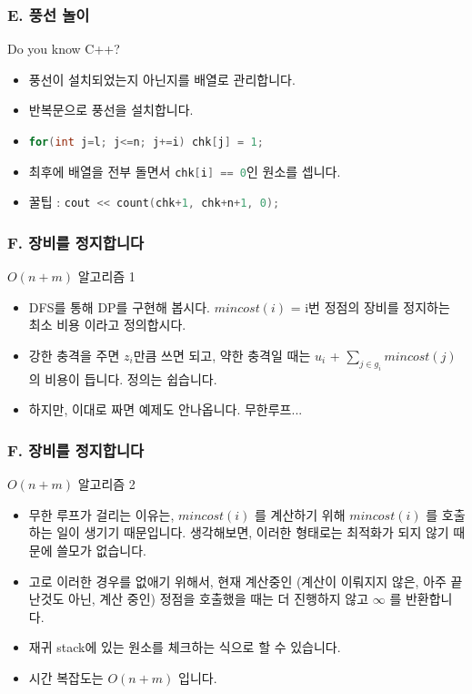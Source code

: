\documentclass{beamer}
\begin{document}
\begin{frame}
	\frametitle{E. 풍선 놀이}
	\begin{block}{Do you know C++?}
		\begin{itemize}
			\item 풍선이 설치되었는지 아닌지를 배열로 관리합니다.
			\item 반복문으로 풍선을 설치합니다. 
			\item \lstinline[language=C++,basicstyle=\ttfamily]{for(int j=l; j<=n; j+=i) chk[j] = 1;}
			\item 최후에 배열을 전부 돌면서 \lstinline[language=C++,basicstyle=\ttfamily]{chk[i] == 0}인 원소를 셉니다.
			\item 꿀팁 : 	\lstinline[language=C++,basicstyle=\ttfamily]{cout << count(chk+1, chk+n+1, 0);}
			
		\end{itemize}
	
	\end{block}
\end{frame}



\begin{frame}
	\frametitle{F. 장비를 정지합니다}
	\begin{block}{$O(n+m)$ 알고리즘 1}
		\begin{itemize}
			\item DFS를 통해 DP를 구현해 봅시다. $mincost(i)$ = i번 정점의 장비를 정지하는 최소 비용 이라고 정의합시다. 
			\item 강한 충격을 주면 $z_i$만큼 쓰면 되고, 약한 충격일 때는 $u_i$ + $\sum_{j \in g_i} mincost(j)$의 비용이 듭니다. 정의는 쉽습니다. 
			\item 하지만, 이대로 짜면 예제도 안나옵니다. 무한루프...
		\end{itemize}
		
	\end{block}
\end{frame}

\begin{frame}
	\frametitle{F. 장비를 정지합니다}
	\begin{block}{$O(n+m)$ 알고리즘 2}
		\begin{itemize}
			\item 무한 루프가 걸리는 이유는, $mincost(i)$ 를 계산하기 위해 $mincost(i)$ 를 호출하는 일이 생기기 때문입니다. 생각해보면, 이러한 형태로는 최적화가 되지 않기 때문에 쓸모가 없습니다. 
			\item 고로 이러한 경우를 없애기 위해서, 현재 계산중인 (계산이 이뤄지지 않은, 아주 끝난것도 아닌, 계산 중인) 정점을 호출했을 때는 더 진행하지 않고 $\infty$ 를 반환합니다. 
			\item 재귀 stack에 있는 원소를 체크하는 식으로 할 수 있습니다.
			\item 시간 복잡도는 $O(n+m)$ 입니다.
		\end{itemize}
	\end{block}
\end{frame}
\end{document}
